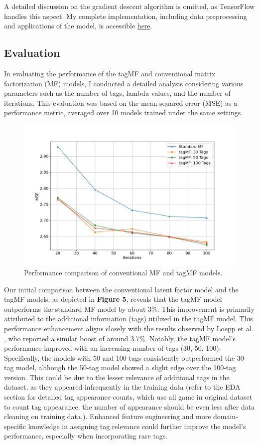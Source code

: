 \documentclass[sigplan,screen]{acmart}
\begin{document}
A detailed discussion on the gradient descent algorithm is omitted, as TensorFlow handles this aspect. My complete implementation, including data preprocessing and applications of the model, is accessible \href{https://github.com/anananan116/CSE158-Assignment2}{here}.
\subsection{Evaluation}
In evaluating the performance of the tagMF and conventional matrix factorization (MF) models, I conducted a detailed analysis considering various parameters such as the number of tags, lambda values, and the number of iterations. This evaluation was based on the mean squared error (MSE) as a performance metric, averaged over 10 models trained under the same settings.

\begin{figure}[h]
  \centering
  \includegraphics[width=\linewidth]{evaluation_1.png}
  \caption{Performance comparison of conventional MF and tagMF models.}
\end{figure}

Our initial comparison between the conventional latent factor model and the tagMF models, as depicted in \textbf{Figure 5}, reveals that the tagMF model outperforms the standard MF model by about 3\%. This improvement is primarily attributed to the additional information (tags) utilized in the tagMF model. This performance enhancement aligns closely with the results observed by Loepp et al. \cite{LOEPP201921}, who reported a similar boost of around 3.7\%. Notably, the tagMF model's performance improved with an increasing number of tags (30, 50, 100). Specifically, the models with 50 and 100 tags consistently outperformed the 30-tag model, although the 50-tag model showed a slight edge over the 100-tag version. This could be due to the lesser relevance of additional tags in the dataset, as they appeared infrequently in the training data (refer to the EDA section for detailed tag appearance counts, which use all game in original dataset to count tag appearance, the number of appearance should be even less after data cleaning on training data.). Enhanced feature engineering and more domain-specific knowledge in assigning tag relevance could further improve the model's performance, especially when incorporating rare tags.
\end{document}
